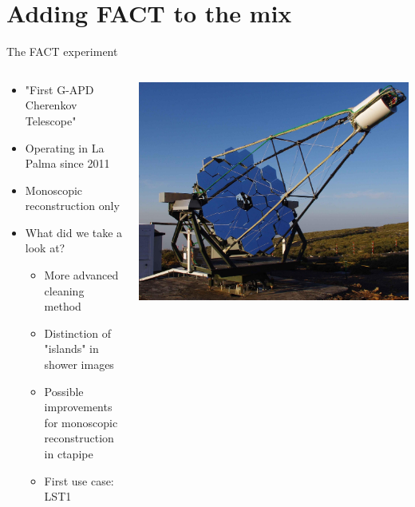 \section{Adding FACT to the mix}

\begin{frame}{The FACT experiment}
    \begin{columns}[T] %
        \begin{column}{.45\textwidth}
            \vspace{10pt}
            \begin{itemize}
                \item "First G-APD Cherenkov Telescope"
                \item Operating in La Palma since 2011
                \item Monoscopic reconstruction only
                \item What did we take a look at?
                \begin{itemize}
                    \item{More advanced cleaning method}
                    \item{Distinction of "islands" in shower images}
                    \item[\rightarrow] Possible improvements for monoscopic reconstruction in ctapipe
                    \item[\rightarrow] First use case: LST1
                \end{itemize}
            \end{itemize}
        \end{column}
        \begin{column}{.48\textwidth}
            \includegraphics[width=\linewidth]{images/fact_telescope.jpg}
            \cite{Anderhub_2013}
        \end{column}
    \end{columns}
\end{frame}


